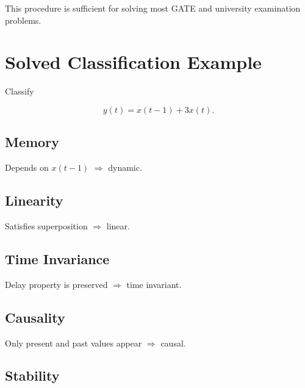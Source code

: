 This procedure is sufficient for solving most GATE and university examination problems.

\section{Solved Classification Example}

Classify

\[
y(t)=x(t-1)+3x(t).
\]


\subsection{Memory}

Depends on \(x(t-1)\) \(\Rightarrow\) dynamic.


\subsection{Linearity}

Satisfies superposition \(\Rightarrow\) linear.


\subsection{Time Invariance}

Delay property is preserved \(\Rightarrow\) time invariant.


\subsection{Causality}

Only present and past values appear \(\Rightarrow\) causal.


\subsection{Stability}

